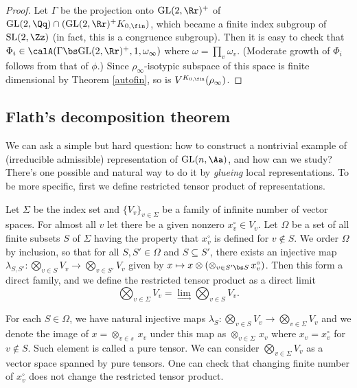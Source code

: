 \begin{proof}
Let $\Gamma$ be the projection onto $\GL(2, \Rr)^{+}$ of $\GL(2, \Qq) \cap (\GL(2, \Rr)^{+}K_{0, \fin})$, which became a finite index subgroup of $\SL(2, \Zz)$ (in fact, this is a congruence subgroup). 
Then it is easy to check that $\Phi_i \in \calA(\Gamma \bs \GL(2, \Rr)^{+}, 1, \omega_{\infty})$ where $\omega = \prod_{v} \omega_{v}$. (Moderate growth of $\Phi_i$ follows from that of $\phi$.) 
Since $\rho_{\infty}$-isotypic subspace of this space is finite dimensional by Theorem \ref{autofin}, so is $V^{K_{0, \fin}}(\rho_\infty)$. 
\end{proof}










\subsection{Flath's decomposition theorem}

We can ask a simple but hard question: how to construct a nontrivial example of (irreducible admissible) representation of $\GL(n, \Aa)$, and how can we study? 
There's one possible and natural way to do it by \emph{glueing} local representations. To be more specific, first we define restricted tensor product of representations. 
\begin{definition}
Let $\Sigma$ be the index set and  $\{V_{v}\}_{v\in \Sigma}$ be a family of infinite number of vector spaces. 
For almost all $v$ let there be a given nonzero $x_{v}^{\circ} \in V_{v}$. 
Let $\Omega$ be a set of all finite subsets $S$ of $\Sigma$ having the property that $x_{v}^{\circ}$ is defined for $v\not\in S$. 
We order $\Omega$ by inclusion, so that for all $S, S'\in \Omega$ and $S\subseteq S'$, there exists an injective map $\lambda_{S, S'} : \bigotimes_{v\in S} V_{v}  \to \bigotimes_{v\in S'} V_{v}$ given by $x\mapsto x\otimes (\otimes_{v\in S'\bs S}\,x_{v}^{\circ})$. 
Then this form a direct family, and we define the restricted tensor product as a direct limit
$$
\bigotimes_{v\in \Sigma} V_{v} = \lim_{\longrightarrow} \bigotimes_{v\in S} V_{v}.
$$
\end{definition}
For each $S\in \Omega$, we have natural injective maps $\lambda_{S} : \bigotimes_{v\in S} V_{v} \to \bigotimes_{v\in \Sigma} V_{v}$ and we denote the image of $x = \otimes_{v\in s} \, x_{v}$ under this map as $\otimes_{v\in \Sigma}\, x_{v}$ where $x_{v} = x_{v}^{\circ}$ for $v\not\in S$. 
Such element is called a pure tensor. 
We can consider $\bigotimes_{v\in \Sigma}V_{v}$ as a vector space spanned by pure tensors. 
One can check that changing finite number of $x_{v}^{\circ}$ does not change the restricted tensor product. 

